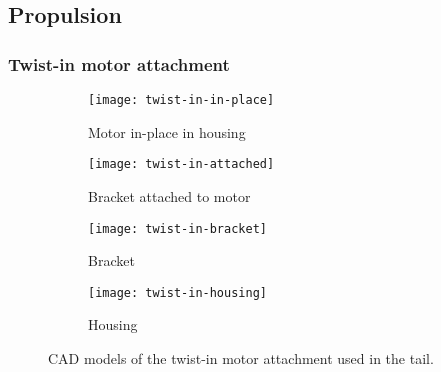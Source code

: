 \documentclass[../../main.tex]{subfiles}
\begin{document}
\subsection{Propulsion} \label{sec:design-process:initial-designs:propulsion}

\subsubsection{Twist-in motor attachment} \label{sec:design-process:initial-designs:propulsion:twist-in-motor-attachment}

\begin{figure}[H]
    \centering
    \begin{subfigure}[b]{0.49\columnwidth}
        \centering
        \texttt{[image: twist-in-in-place]}
        \caption{Motor in-place in housing}
        \label{fig:twist-in:in-place}
    \end{subfigure}
    \hfill
    \begin{subfigure}[b]{0.49\columnwidth}
        \centering
        \texttt{[image: twist-in-attached]}
        \caption{Bracket attached to motor}
        \label{fig:twist-in:attached}
    \end{subfigure}

    \begin{subfigure}[b]{0.49\columnwidth}
        \centering
        \texttt{[image: twist-in-bracket]}
        \caption{Bracket}
        \label{fig:twist-in:bracket}
    \end{subfigure}
    \hfill
    \begin{subfigure}[b]{0.49\columnwidth}
        \centering
        \texttt{[image: twist-in-housing]}
        \caption{Housing}
        \label{fig:twist-in:housing}
    \end{subfigure}
    \caption{CAD models of the twist-in motor attachment used in the tail.}
    \label{fig:twist-in}
\end{figure}
\end{document}
